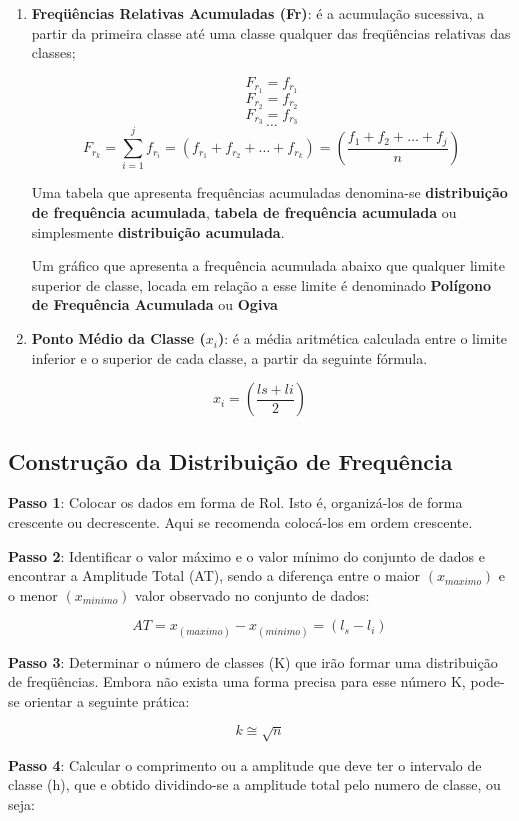 \begin{enumerate}
\item \textbf{Freqüências Relativas Acumuladas (Fr)}: é a acumulação sucessiva, a partir da primeira classe até uma classe qualquer das freqüências relativas das classes;

    $$ F_{r_{1}}=f_{r_{1}} $$
    $$ F_{r_{2}}=f_{r_{2}} $$
    $$ F_{r_{3}}=f_{r_{3}} $$
    $$   \ldots  $$
    $$ F_{r_{k}}=  \sum_{i=1}^{j}f_{r_{i}}  = (f_{r_{1}}+f_{r_{2}}+\ldots+ f_{r_{k}}) = \left( \frac{f_{1}+f_{2}+\ldots+f_{j}}{n} \right) $$

Uma tabela que apresenta frequências acumuladas denomina-se \textbf{distribuição de frequência acumulada}, \textbf{tabela de frequência acumulada} ou simplesmente \textbf{distribuição acumulada}.\vskip0.3cm

Um gráfico que apresenta a frequência acumulada abaixo que qualquer limite superior de classe, locada em relação a esse limite é denominado \textbf{Polígono de Frequência Acumulada} ou \textbf{Ogiva}


\item \textbf{Ponto Médio da Classe ($x_{i}$)}: é a média aritmética calculada entre o limite inferior e o superior de cada classe, a partir da seguinte fórmula.
\end{enumerate}

$$ x_{i} = \left( \frac{ls+li}{2} \right)$$


\newpage
\subsection{Construção da Distribuição de Frequência}

\textbf{Passo 1}: Colocar os dados em forma de Rol. Isto é, organizá-los de forma crescente ou decrescente. Aqui se recomenda colocá-los em ordem crescente.\vskip0.3cm

\textbf{Passo 2}: Identificar o valor máximo e o valor mínimo do conjunto de dados e encontrar a Amplitude Total (AT), sendo a diferença entre o maior $(x_{maximo})$ e o menor $(x_{minimo})$  valor observado no conjunto de dados:

$$ AT= x_{(maximo)}- x_{(minimo)} = (l_{s} - l_{i})$$

\textbf{Passo 3}: Determinar o número de classes (K) que irão formar uma distribuição de freqüências. Embora não exista uma forma precisa para esse número K, pode-se orientar a seguinte prática:


$$ k \cong \sqrt{n}$$


\textbf{Passo 4}: Calcular o comprimento ou a amplitude que deve ter o intervalo de classe (h), que e obtido dividindo-se a amplitude total pelo numero de classe, ou seja:


